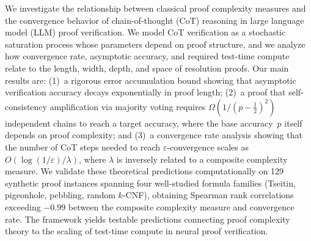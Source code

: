 We investigate the relationship between classical proof complexity measures and
the convergence behavior of chain-of-thought (CoT) reasoning in large language
model (LLM) proof verification.  We model CoT verification as a stochastic
saturation process whose parameters depend on proof structure, and we analyze
how convergence rate, asymptotic accuracy, and required test-time compute
relate to the length, width, depth, and space of resolution proofs.  Our main
results are: (1)~a rigorous error accumulation bound showing that asymptotic
verification accuracy decays exponentially in proof length; (2)~a proof that
self-consistency amplification via majority voting requires
$\Omega(1/(p-\tfrac{1}{2})^2)$ independent chains to reach a target accuracy,
where the base accuracy~$p$ itself depends on proof complexity; and (3)~a
convergence rate analysis showing that the number of CoT steps needed to reach
$\varepsilon$-convergence scales as $O(\log(1/\varepsilon)/\lambda)$, where
$\lambda$ is inversely related to a composite complexity measure.  We validate
these theoretical predictions computationally on 129 synthetic proof instances
spanning four well-studied formula families (Tseitin, pigeonhole, pebbling,
random $k$-CNF), obtaining Spearman rank correlations exceeding $-0.99$ between
the composite complexity measure and convergence rate.  The framework yields
testable predictions connecting proof complexity theory to the scaling of
test-time compute in neural proof verification.

